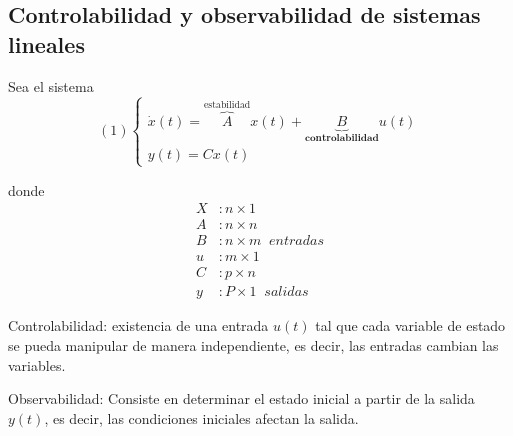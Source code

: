 \subsection{Controlabilidad y observabilidad de sistemas lineales}

Sea el sistema 
\[(1)
    \left\{
        \begin{array}{lll}
            \dot{x}(t) = \overbrace{ A }^{ \text{estabilidad} }x(t) + \underbrace{ B }_{ \textbf{controlabilidad} }u(t) \\
            y(t) = Cx(t)
        \end{array}
    \right.
\]

donde 
\[
    \begin{split}
        X & : n \times 1 \\
        A & : n \times n \\
        B & : n \times m \;\; entradas \\
        u & : m \times 1 \\
        C & : p \times n \\
        y & : P \times 1 \;\; salidas
    \end{split}
\]

Controlabilidad: existencia de una entrada \( u(t) \) tal que cada variable de estado se pueda manipular de manera independiente, es decir, las entradas cambian las variables.

Observabilidad: Consiste en determinar el estado inicial a partir de la salida \( y(t) \), es decir, las condiciones iniciales afectan la salida.

